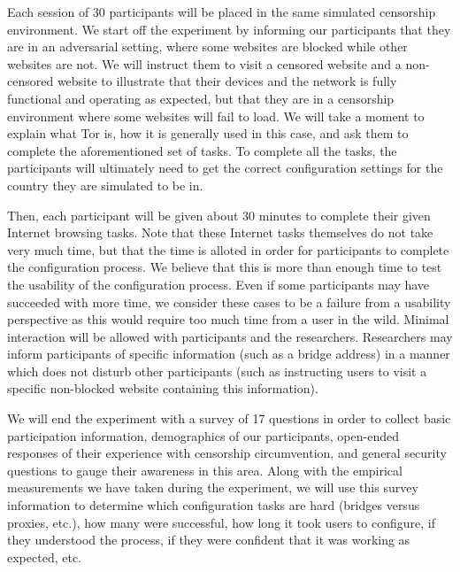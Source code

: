 \documentclass[letterpaper,twocolumn,11pt]{article}
\begin{document}
Each session of 30 participants will be placed in the same simulated censorship environment. 
We start off the experiment by informing our participants that they are in an adversarial setting, 
where some websites are blocked while other websites are not. We will instruct them to visit a censored
website and a non-censored website to illustrate that their devices and the network is fully functional and
operating as expected, but that they are in a censorship environment where some websites will fail to load. 
We will take a moment to explain what Tor is, how it is generally used in this case, and ask them to complete 
the aforementioned set of tasks. To complete all the tasks, the participants will ultimately need to get the correct
configuration settings for the country they are simulated to be in. 

Then, each participant will be given about 30 minutes to complete their given Internet browsing tasks. 
Note that these Internet tasks themselves do not take very much time, but that the time is alloted in order
for participants to complete the configuration process. We believe that this is more than enough time to 
test the usability of the configuration process. Even if some participants may have succeeded with more 
time, we consider these cases to be a failure from a usability perspective as this would require too much
time from a user in the wild. Minimal interaction will be allowed with participants and the researchers. 
Researchers may inform participants of specific information (such as a bridge address) in a manner 
which does not disturb other participants (such as instructing users to visit a specific non-blocked website 
containing this information). 

We will end the experiment with a survey of 17 questions in order to collect basic participation information, 
demographics of our participants, open-ended responses of their experience with censorship circumvention,
and general security questions to gauge their awareness in this area. Along with the empirical measurements 
we have taken during the experiment, we will use this survey information to determine which configuration tasks are hard (bridges versus proxies, etc.), how many were successful, how long it took users to configure, if they understood the process, if they were confident that it was working as expected, etc.  
\end{document}
